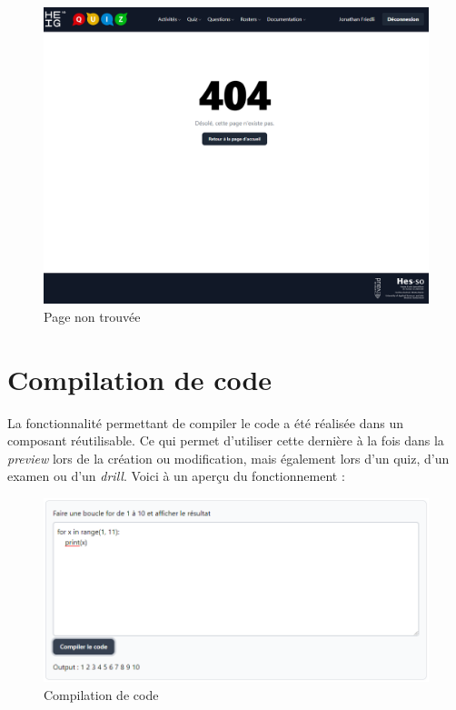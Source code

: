 \begin{center}
    \begin{figure}[H]
        \includegraphics[width=\textwidth]{./assets/figures/page404.png}
        \caption{Page non trouvée}
    \end{figure}
\end{center}


\section{Compilation de code}
La fonctionnalité permettant de compiler le code a été réalisée dans un composant réutilisable. Ce qui permet d'utiliser cette dernière à la fois dans la \emph{preview} lors de la création ou modification, mais également lors d'un quiz, d'un examen ou d'un \emph{drill}.
Voici à un aperçu du fonctionnement :
\begin{center}
    \begin{figure}[H]
        \includegraphics[width=\textwidth]{./assets/figures/codeCompilation.png}
        \caption{Compilation de code}
    \end{figure}
\end{center}

